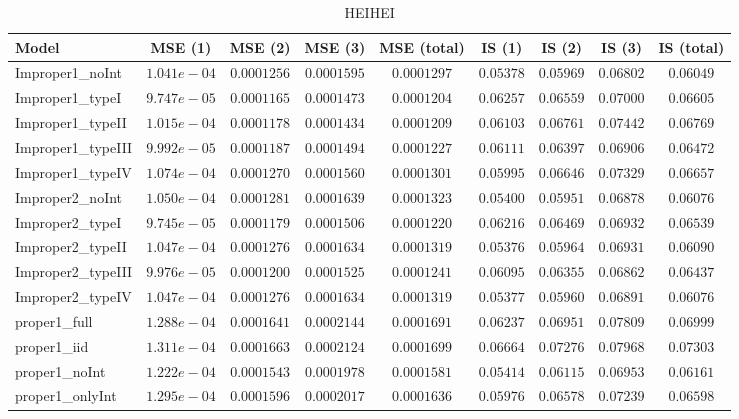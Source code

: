 \begin{table}

\caption{\label{tab:model-choice-sc3}HEIHEI}
\centering
\begin{tabular}{lcccccccc}
\hline
Model  & MSE (1) & MSE (2) & MSE (3) & MSE (total) & IS (1) & IS (2) & IS (3) & \multicolumn{1}{c}{IS (total)} \\ 
\hline
Improper1_noInt  & $1.041e-04$ & $0.0001256$ & $0.0001595$ & $0.0001297$ & $0.05378$ & $0.05969$ & $0.06802$ & $0.06049$ \\
Improper1_typeI  & $9.747e-05$ & $0.0001165$ & $0.0001473$ & $0.0001204$ & $0.06257$ & $0.06559$ & $0.07000$ & $0.06605$ \\
Improper1_typeII  & $1.015e-04$ & $0.0001178$ & $0.0001434$ & $0.0001209$ & $0.06103$ & $0.06761$ & $0.07442$ & $0.06769$ \\
Improper1_typeIII  & $9.992e-05$ & $0.0001187$ & $0.0001494$ & $0.0001227$ & $0.06111$ & $0.06397$ & $0.06906$ & $0.06472$ \\
Improper1_typeIV  & $1.074e-04$ & $0.0001270$ & $0.0001560$ & $0.0001301$ & $0.05995$ & $0.06646$ & $0.07329$ & $0.06657$ \\
Improper2_noInt  & $1.050e-04$ & $0.0001281$ & $0.0001639$ & $0.0001323$ & $0.05400$ & $0.05951$ & $0.06878$ & $0.06076$ \\
Improper2_typeI  & $9.745e-05$ & $0.0001179$ & $0.0001506$ & $0.0001220$ & $0.06216$ & $0.06469$ & $0.06932$ & $0.06539$ \\
Improper2_typeII  & $1.047e-04$ & $0.0001276$ & $0.0001634$ & $0.0001319$ & $0.05376$ & $0.05964$ & $0.06931$ & $0.06090$ \\
Improper2_typeIII  & $9.976e-05$ & $0.0001200$ & $0.0001525$ & $0.0001241$ & $0.06095$ & $0.06355$ & $0.06862$ & $0.06437$ \\
Improper2_typeIV  & $1.047e-04$ & $0.0001276$ & $0.0001634$ & $0.0001319$ & $0.05377$ & $0.05960$ & $0.06891$ & $0.06076$ \\
proper1_full  & $1.288e-04$ & $0.0001641$ & $0.0002144$ & $0.0001691$ & $0.06237$ & $0.06951$ & $0.07809$ & $0.06999$ \\
proper1_iid  & $1.311e-04$ & $0.0001663$ & $0.0002124$ & $0.0001699$ & $0.06664$ & $0.07276$ & $0.07968$ & $0.07303$ \\
proper1_noInt  & $1.222e-04$ & $0.0001543$ & $0.0001978$ & $0.0001581$ & $0.05414$ & $0.06115$ & $0.06953$ & $0.06161$ \\
proper1_onlyInt  & $1.295e-04$ & $0.0001596$ & $0.0002017$ & $0.0001636$ & $0.05976$ & $0.06578$ & $0.07239$ & $0.06598$ \\

\end{tabular}
\end{table}
